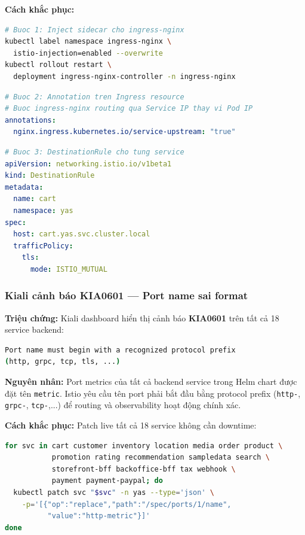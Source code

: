 \textbf{Cách khắc phục:}

\begin{lstlisting}[language=bash]
# Buoc 1: Inject sidecar cho ingress-nginx
kubectl label namespace ingress-nginx \
  istio-injection=enabled --overwrite
kubectl rollout restart \
  deployment ingress-nginx-controller -n ingress-nginx
\end{lstlisting}

\begin{lstlisting}[language=yaml]
# Buoc 2: Annotation tren Ingress resource
# Buoc ingress-nginx routing qua Service IP thay vi Pod IP
annotations:
  nginx.ingress.kubernetes.io/service-upstream: "true"
\end{lstlisting}

\begin{lstlisting}[language=yaml]
# Buoc 3: DestinationRule cho tung service
apiVersion: networking.istio.io/v1beta1
kind: DestinationRule
metadata:
  name: cart
  namespace: yas
spec:
  host: cart.yas.svc.cluster.local
  trafficPolicy:
    tls:
      mode: ISTIO_MUTUAL
\end{lstlisting}

\subsubsection{Kiali cảnh báo KIA0601 — Port name sai format}

\textbf{Triệu chứng:} Kiali dashboard hiển thị cảnh báo \textbf{KIA0601} trên tất cả 18 service backend:

\begin{lstlisting}[language=bash]
Port name must begin with a recognized protocol prefix
(http, grpc, tcp, tls, ...)
\end{lstlisting}

\textbf{Nguyên nhân:} Port metrics của tất cả backend service trong Helm chart được đặt tên \texttt{metric}. Istio yêu cầu tên port phải bắt đầu bằng protocol prefix (\texttt{http-}, \texttt{grpc-}, \texttt{tcp-},...) để routing và observability hoạt động chính xác.

\textbf{Cách khắc phục:} Patch live tất cả 18 service không cần downtime:

\begin{lstlisting}[language=bash]
for svc in cart customer inventory location media order product \
           promotion rating recommendation sampledata search \
           storefront-bff backoffice-bff tax webhook \
           payment payment-paypal; do
  kubectl patch svc "$svc" -n yas --type='json' \
    -p='[{"op":"replace","path":"/spec/ports/1/name",
          "value":"http-metric"}]'
done
\end{lstlisting}

